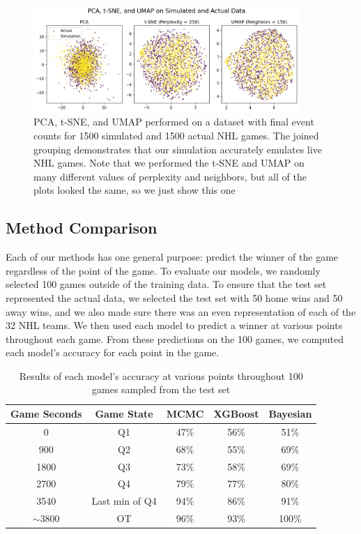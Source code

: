 \documentclass[11pt]{article}
\begin{document}
\begin{figure}
    \centering
    \includegraphics[width=0.9\textwidth]{images/pca_tsne_umap_sim_act.png}
    \caption{PCA, t-SNE, and UMAP performed on a dataset with final event counts for 1500 simulated and 1500 actual NHL games. The joined grouping demonstrates that our simulation accurately emulates live NHL games. Note that we performed the t-SNE and UMAP on many different values of perplexity and neighbors, but all of the plots looked the same, so we just show this one}
    \label{fig:simulation_v_actual}
\end{figure}

\subsection{Method Comparison}
Each of our methods has one general purpose: predict the winner of the game regardless of the point of the game. 
To evaluate our models, we randomly selected 100 games outside of the training data. 
To ensure that the test set represented the actual data, we selected the test set with 50 home wins and 50 away wins, 
and we also made sure there was an even representation of each of the 32 NHL teams. 
We then used each model to predict a winner at various points throughout each game. 
From these predictions on the 100 games, we computed each model's accuracy for each point in the game.

\begin{table}
    \centering
    \begin{tabular}{ |c|c|c|c|c| } 
    \hline
    \textbf{Game Seconds} & \textbf{Game State} & \textbf{MCMC} & \textbf{XGBoost} & \textbf{Bayesian} \\ 
    \hline
    0 & Q1 & 47\% & 56\% & 51\% \\ 
    \hline
    900 & Q2 & 68\% & 55\% & 69\% \\
    \hline
    1800 & Q3 & 73\% & 58\% & 69\% \\
    \hline
    2700 & Q4 & 79\% & 77\% & 80\% \\
    \hline
    3540 & Last min of Q4 & 94\% & 86\% & 91\% \\
    \hline
     \(\sim \)3800 & OT & 96\% & 93\% & 100\% \\
    \hline
    \end{tabular}
    \caption{Results of each model's accuracy at various points throughout 100 games sampled from the test set}
    \label{tab:game_accuracies}
\end{table}
\end{document}
